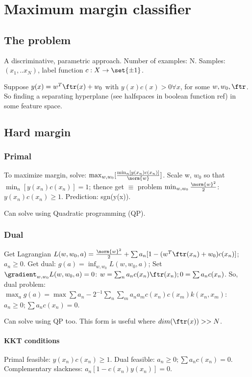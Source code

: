 \documentclass[oneside, article]{memoir}
\begin{document}
\section{Maximum margin classifier}
\subsection{The problem}
A discriminative, parametric approach. Number of examples: N. Samples: $(x_{1}, .. x_{N})$, label function $c:X \to \set{\pm 1}$.

Suppose $y(x) = w^{T} \ftr(x) + w_0$ with $y(x)c(x) > 0 \forall x$, for some $w, w_0, \ftr$. So finding a separating hyperplane (see halfspaces in boolean function ref) in some feature space.

\subsection{Hard margin}
\subsubsection{Primal}
To maximize margin, solve: $\max_{w,w_0}[\frac{\min_{n}[y(x_{n})c(x_{n})]}{\norm{w}}]$. Scale w, $w_0$ so that $\min_{n}[y(x_{n})c(x_{n})] = 1$; thence get $\equiv$ problem $\min_{w,w_0}\frac{\norm{w}^{2}}{2}$: $y(x_{n})c(x_{n}) \geq 1$. Prediction: sgn(y(x)).

Can solve using Quadratic programming (QP).

\subsubsection{Dual}
Get Lagrangian $L(w, w_0, a) = \frac{\norm{w}^{2}}{2} + \sum a_{n}[1-(w^{T} \ftr(x_n) + w_0)c(x_{n})]$; $a_{n} \geq 0$. Get dual: $g(a) = \inf_{w, w_0} L(w, w_0, a)$; Set $\gradient_{w, w_0} L(w, w_0, a) = 0$: $w = \sum_{n}a_{n}c(x_{n}) \ftr(x_{n}); 0 = \sum a_{n}c(x_{n})$. So, dual problem: $\max_a g(a) = \max \sum a_{n} - 2^{-1}\sum_{n}\sum_{m} a_{n}a_{m}c(x_{n})c(x_{m})k(x_{n}, x_{m})$: $a_{n} \geq 0; \sum a_{n}c(x_{n}) = 0$.

Can solve using QP too. This form is useful where $dim(\ftr(x)) >>N$.

\paragraph*{KKT conditions}
Primal feasible: $y(x_{n})c(x_{n}) \geq 1$. Dual feasible: $a_{n} \geq 0; \sum a_{n}c(x_{n}) = 0$. Complementary slackness: $a_{n}[1 - c(x_{n}) y(x_{n})] = 0$.
\end{document}

